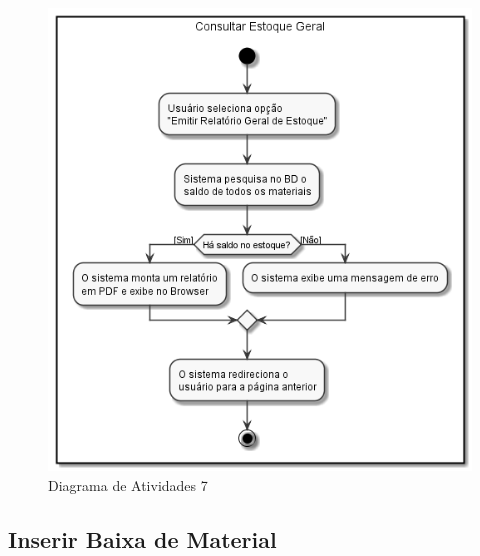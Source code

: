 \documentclass[rascunho,xindy,acronym,symbols]{fei}
\begin{document}
\begin{figure}[H]
    \centering
    \includegraphics[scale=0.6, width=400pt]{./Images/Consultar_Estoque_Geral.png}
    \caption{Diagrama de Atividades 7}
    \label{fig:diag_atv7}
\end{figure}

\subsection{Inserir Baixa de Material}
\end{document}
